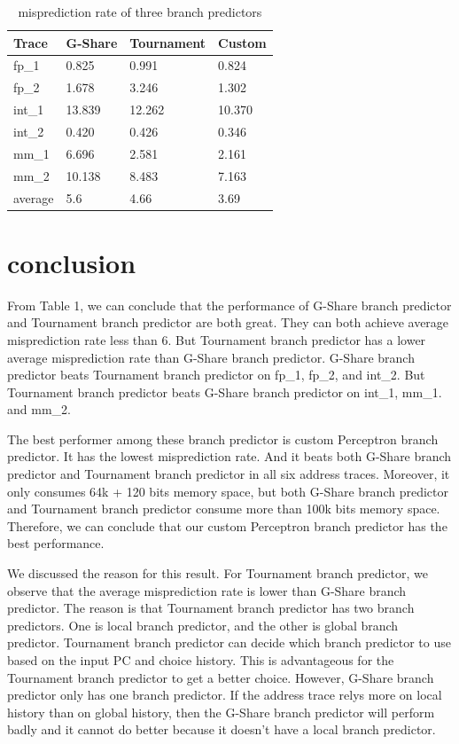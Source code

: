 \documentclass[conference]{IEEEtran}
\begin{document}
\begin{scriptsize}
\begin{table}[h!]
  \centering
  \caption{misprediction rate of three branch predictors}
  \label{table:formatting}
  \begin{tabular}{|l|l|l|l|}
    \hline
    \textbf{Trace} & \textbf{G-Share} & \textbf{Tournament} & \textbf{Custom}\\
    \hline
    fp\_1 & 0.825 & 0.991 & 0.824\\
    \hline
    fp\_2 & 1.678 & 3.246 & 1.302\\
    \hline
    int\_1 & 13.839 & 12.262 & 10.370\\
    \hline
    int\_2 & 0.420 & 0.426 & 0.346\\
    \hline
    mm\_1 & 6.696 & 2.581 & 2.161\\
    \hline
    mm\_2 & 10.138 & 8.483 & 7.163\\
    \hline
    average & 5.6 & 4.66 & 3.69\\
    \hline
  \end{tabular}
\end{table}
\end{scriptsize}

\section{conclusion}
From Table 1, we can conclude that the performance of G-Share branch predictor and Tournament branch predictor are both great. They can both achieve average misprediction rate less than 6. But 
Tournament branch predictor has a lower average misprediction rate than G-Share branch predictor. 
G-Share branch predictor beats Tournament branch predictor on fp\_1, fp\_2, and int\_2. But Tournament branch predictor beats G-Share branch predictor on int\_1, mm\_1. and mm\_2. 

The best performer among these branch predictor is custom Perceptron branch predictor. It has the lowest misprediction rate. And it beats both G-Share branch predictor and Tournament branch predictor in all
six address traces. Moreover, it only consumes 64k + 120 bits memory space, but both G-Share branch predictor and Tournament branch predictor consume more than 100k bits memory space. Therefore, we can conclude that our 
custom Perceptron branch predictor has the best performance. 

We discussed the reason for this result. For Tournament branch predictor, we observe that the average misprediction rate is lower than G-Share branch predictor. 
The reason is that Tournament branch predictor has two branch predictors. One is local branch predictor, and the other is global branch predictor. Tournament branch predictor can decide which branch predictor to use 
based on the input PC and choice history. This is advantageous for the Tournament branch predictor to get a better choice. However, G-Share branch predictor only has one branch predictor. 
If the address trace relys more on local history than on global history, then the G-Share branch predictor will perform badly and it cannot do better because it doesn't have a local branch predictor. 
\end{document}
